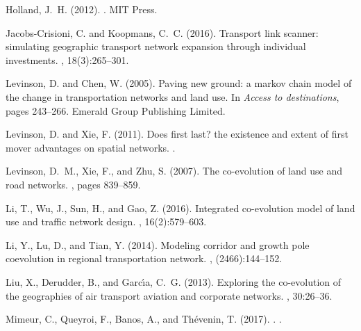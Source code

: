 \documentclass[11pt]{article}
\begin{document}
\begin{thebibliography}{}
Holland, J.~H. (2012).
.
\newblock MIT Press.

Jacobs-Crisioni, C. and Koopmans, C.~C. (2016).
\newblock Transport link scanner: simulating geographic transport network
  expansion through individual investments.
, 18(3):265--301.

Levinson, D. and Chen, W. (2005).
\newblock Paving new ground: a markov chain model of the change in
  transportation networks and land use.
\newblock In {\em Access to destinations}, pages 243--266. Emerald Group
  Publishing Limited.

Levinson, D. and Xie, F. (2011).
\newblock Does first last? the existence and extent of first mover advantages
  on spatial networks.
.

Levinson, D.~M., Xie, F., and Zhu, S. (2007).
\newblock The co-evolution of land use and road networks.
, pages 839--859.

Li, T., Wu, J., Sun, H., and Gao, Z. (2016).
\newblock Integrated co-evolution model of land use and traffic network design.
, 16(2):579--603.

Li, Y., Lu, D., and Tian, Y. (2014).
\newblock Modeling corridor and growth pole coevolution in regional
  transportation network.
, (2466):144--152.

Liu, X., Derudder, B., and Garc{\'\i}a, C.~G. (2013).
\newblock Exploring the co-evolution of the geographies of air transport
  aviation and corporate networks.
, 30:26--36.

Mimeur, C., Queyroi, F., Banos, A., and Th{\'e}venin, T. (2017).
.
.


\end{thebibliography}
\end{document}
